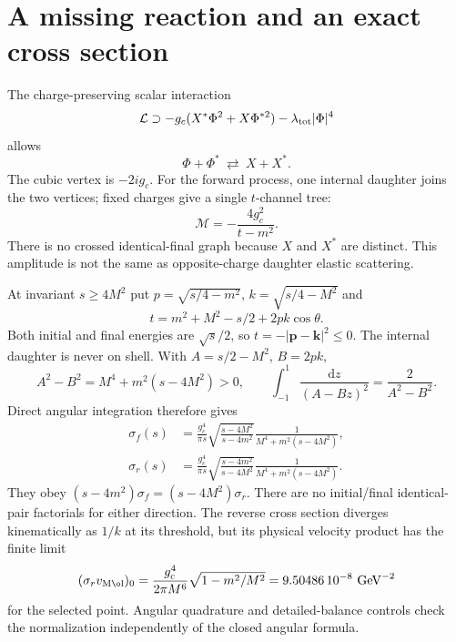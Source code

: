 \documentclass[11pt]{article}
\newcommand{\dd}{\mathrm d}
\begin{document}
\section{A missing reaction and an exact cross section}
The charge-preserving scalar interaction
\begin{equation}
 \mathcal L\supset-g_c(X^*\Phi^2+X\Phi^{*2})
 -\lambda_{\rm tot}|\Phi|^4
\end{equation}
allows
\begin{equation}
 \Phi+\Phi^*\ \rightleftarrows\ X+X^*.
\label{eq:pair}
\end{equation}
The cubic vertex is $-2ig_c$. For the forward process, one internal daughter
joins the two vertices; fixed charges give a single $t$-channel tree:
\begin{equation}
 \mathcal M=-\frac{4g_c^2}{t-m^2}.
\end{equation}
There is no crossed identical-final graph because $X$ and $X^*$ are distinct.
This amplitude is not the same as opposite-charge daughter elastic scattering.

At invariant $s\ge4M^2$ put
$p=\sqrt{s/4-m^2}$, $k=\sqrt{s/4-M^2}$ and
\begin{equation}
 t=m^2+M^2-s/2+2pk\cos\theta.
\end{equation}
Both initial and final energies are $\sqrt s/2$, so
$t=-|\mathbf p-\mathbf k|^2\le0$. The internal daughter is never on shell.
With $A=s/2-M^2$, $B=2pk$,
\begin{equation}
 A^2-B^2=M^4+m^2(s-4M^2)>0,\qquad
 \int_{-1}^1\frac{\dd z}{(A-Bz)^2}=\frac2{A^2-B^2}.
\end{equation}
Direct angular integration therefore gives
\begin{align}
 \sigma_f(s)&=\frac{g_c^4}{\pi s}
 \sqrt{\frac{s-4M^2}{s-4m^2}}
 \frac1{M^4+m^2(s-4M^2)},\\
 \sigma_r(s)&=\frac{g_c^4}{\pi s}
 \sqrt{\frac{s-4m^2}{s-4M^2}}
 \frac1{M^4+m^2(s-4M^2)}.
\end{align}
They obey
$(s-4m^2)\sigma_f=(s-4M^2)\sigma_r$.
There are no initial/final identical-pair factorials for either direction.
The reverse cross section diverges kinematically as $1/k$ at its threshold,
but its physical velocity product has the finite limit
\begin{equation}
 (\sigma_r v_{\rm M\o l})_0
 =\frac{g_c^4}{2\pi M^6}\sqrt{1-m^2/M^2}
 =9.50486\,10^{-8}\ \mathrm{GeV}^{-2}
\end{equation}
for the selected point. Angular quadrature and detailed-balance controls
check the normalization independently of the closed angular formula.
\end{document}
